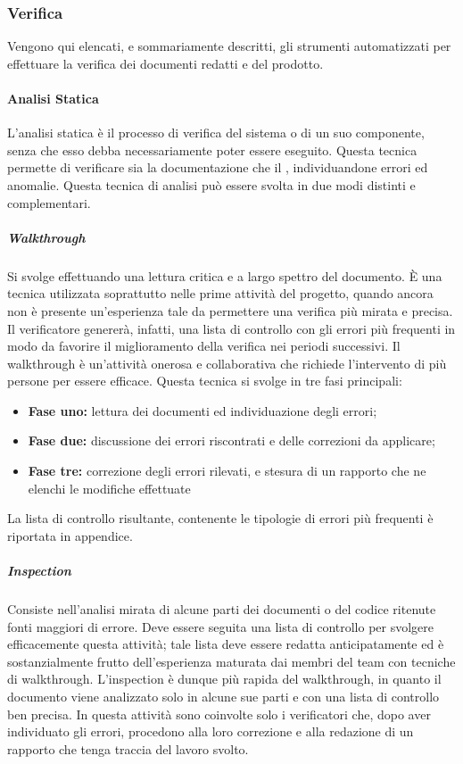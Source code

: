       
  \subsubsection{Verifica}
    Vengono qui elencati, e sommariamente descritti, gli strumenti automatizzati per effettuare la verifica dei documenti redatti e del  prodotto.

\paragraph{Analisi Statica}
    L'analisi statica è il processo di verifica del sistema o di un suo componente, senza che esso debba necessariamente poter essere eseguito.
    Questa tecnica permette di verificare sia la documentazione che il , individuandone errori ed anomalie. Questa tecnica di analisi può essere svolta in due modi distinti e complementari.
    
    \subparagraph{Walkthrough}
    Si svolge effettuando una lettura critica e a largo spettro del documento.
È una tecnica utilizzata soprattutto nelle prime attività del progetto, quando ancora
non è presente un'esperienza tale da permettere una verifica più mirata e precisa.
Il verificatore genererà, infatti, una lista di controllo con gli errori più frequenti
in modo da favorire il miglioramento della verifica nei periodi successivi.
Il walkthrough è un'attività onerosa e collaborativa che richiede l'intervento di
più persone per essere efficace. Questa tecnica si svolge in tre fasi principali:
\begin{itemize}
\item \textbf{Fase uno:} lettura dei documenti ed individuazione degli errori;
\item \textbf{Fase due:} discussione dei errori riscontrati e delle correzioni da applicare;
\item \textbf{Fase tre:} correzione degli errori rilevati, e stesura di un rapporto che ne elenchi le modifiche effettuate
\end{itemize}

La lista di controllo risultante, contenente le tipologie di errori più frequenti è riportata in appendice.

    \subparagraph{Inspection}
	Consiste nell'analisi mirata di alcune parti dei documenti o del codice ritenute fonti maggiori di errore. Deve essere seguita una lista di controllo per svolgere efficacemente questa attività; tale lista deve essere redatta anticipatamente ed è sostanzialmente frutto dell'esperienza maturata dai membri del team con tecniche di walkthrough.
L'inspection è dunque più rapida del walkthrough, in quanto il documento viene
analizzato solo in alcune sue parti e con una lista di controllo ben precisa. In questa
attività sono coinvolte solo i verificatori che, dopo aver individuato gli errori, procedono
alla loro correzione e alla redazione di un rapporto che tenga traccia del lavoro svolto.



